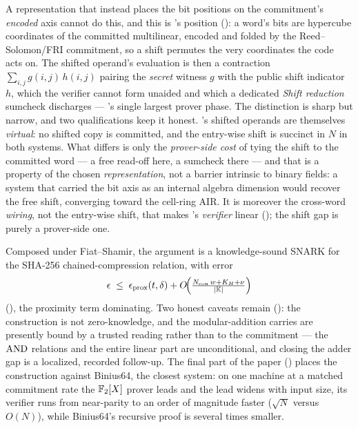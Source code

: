 \begin{remark}
A representation that instead places the bit positions on the commitment's
\emph{encoded} axis cannot do this, and this is \binius{}'s position
(): a word's bits are hypercube coordinates of the committed
multilinear, encoded and folded by the Reed--Solomon/FRI commitment, so a shift
permutes the very coordinates the code acts on. The shifted operand's evaluation
is then a contraction $\sum_{i,j} g(i,j)\,h(i,j)$ pairing the \emph{secret}
witness $g$ with the public shift indicator $h$, which the verifier cannot form
unaided and which a dedicated \emph{Shift reduction} sumcheck discharges ---
\binius{}'s single largest prover phase. The distinction is sharp but narrow,
and two qualifications keep it honest. \binius{}'s shifted operands are
themselves \emph{virtual}: no shifted copy is committed, and the entry-wise
shift is succinct in $N$ in both systems. What differs is only the
\emph{prover-side cost} of tying the shift to the committed word --- a free
read-off here, a sumcheck there --- and that is a property of the chosen
\emph{representation}, not a barrier intrinsic to binary fields: a system that
carried the bit axis as an internal algebra dimension would recover the free
shift, converging toward the cell-ring AIR. It is moreover the cross-word
\emph{wiring}, not the entry-wise shift, that makes \binius{}'s \emph{verifier}
linear (); the shift gap is purely a prover-side one.
\end{remark}

Composed under Fiat--Shamir, the argument is a knowledge-sound SNARK for the
SHA-256 chained-compression relation, with error
\[
  \epsilon \;\le\; \epsilon_{\mathrm{prox}}(t,\delta)
  + O\!\Bigl(\tfrac{N_{\mathrm{con}}\,w + K_H + \nu}{|\mathbb{K}|}\Bigr)
\]
(), the proximity term dominating. Two honest caveats remain
(): the construction is not zero-knowledge, and the
modular-addition carries are presently bound by a trusted reading rather
than to the commitment --- the $\operatorname{AND}$ relations and the entire linear part
are unconditional, and closing the adder gap is a localized, recorded
follow-up. The final part of the paper () places the
construction against Binius64, the closest system: on one machine at a
matched commitment rate the $\mathbb{F}_2[X]$ prover leads and the lead widens with
input size, its verifier runs from near-parity to an order of magnitude
faster ($\sqrt N$ versus $O(N)$), while Binius64's recursive proof is
several times smaller.
